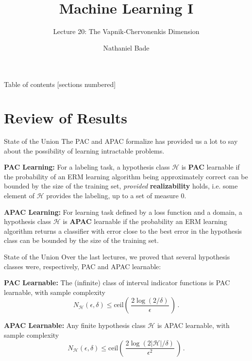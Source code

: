 \documentclass[10pt, table, dvipsnames, handout]{beamer}
\title{Machine Learning I}
\subtitle{Lecture 20: The Vapnik-Chervonenkis Dimension}
\date{}
\author{Nathaniel Bade}
\institute{Northeastern University Department of Mathematics}
\newcommand{\cH}{\ensuremath{\mathcal{H}}}
\begin{document}
\maketitle

\begin{frame}{Table of contents}
  [sections numbered]
  \tableofcontents[hideallsubsections]
\end{frame}





\section{Review of Results}

\begin{frame}[fragile]{State of the Union}
The PAC and APAC formalize has provided us a lot to say about the possibility of learning intractable problems. \pause

\textbf{PAC Learning:} For a labeling task, a hypothesis class $\cH$ is \textbf{PAC} learnable if the probability of an ERM learning algorithm being approximately correct can be bounded by the size of the training set, \textit{provided} \textbf{realizability} holds, i.e. some element of $\cH$ provides the labeling, up to a set of measure 0.\pause

\textbf{APAC Learning:} For learning task defined by a loss function and a domain, a hypothesis class $\cH$ is \textbf{APAC} learnable if the probability an ERM learning algorithm returns a classifier with error close to the best error in the hypothesis class can be bounded by the size of the training set.
\end{frame}





\begin{frame}[fragile]{State of the Union}
Over the last lectures, we proved that several hypothesis classes were, respectively, PAC and APAC learnable:\pause


\textbf{PAC Learnable:} The (infinite) class of interval indicator functions is PAC learnable, with sample complexity
$$
N_\cH(\epsilon,\delta) \leq \text{ceil}\left(\, \frac{2\log (2/\delta)}{\epsilon}\,\right)\,.
$$
\pause

\textbf{APAC Learnable:} Any finite hypothesis class $\cH$ is APAC learnable, with sample complexity
$$
N_\cH(\epsilon,\delta) \leq \text{ceil}\left(\, \frac{2\log (2|\cH|/\delta)}{\epsilon^2}\,\right)\,.
$$
\end{frame}
\end{document}
